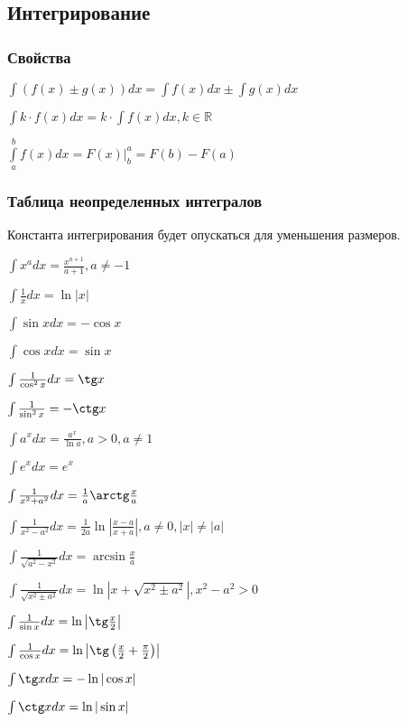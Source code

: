 \subsection{Интегрирование}

\subsubsection{Свойства}

$ \int (f(x) \pm g(x)) dx = \int f(x) dx \pm \int g(x) dx $

$ \int k\cdot f(x) dx = k\cdot \int f(x) dx, k \in \mathbb{R} $

$ \int\limits_a^b f(x) dx = \left.F(x)\right|_b^a = F(b) - F(a) $

\subsubsection{Таблица неопределенных интегралов}

Константа интегрирования будет опускаться для уменьшения размеров.

$ \int x^a dx = \frac{x^{a+1}}{a+1}, a \neq -1 $

$ \int \frac{1}{x} dx = \ln|x| $

$ \int \sin x dx = -\cos x $

$ \int \cos x dx = \sin x $

$ \int \frac{1}{\cos^2 x} dx = \tg x $

$ \int \frac{1}{\sin^2 x} = -\ctg x $

$ \int a^x dx = \frac{a^x}{\ln a}, a>0, a \neq 1 $

$ \int e^x dx = e^x $

$ \int \frac{1}{x^2 + a^2} dx = \frac{1}{a} \arctg\frac{x}{a} $

$ \int \frac{1}{x^2 - a^2} dx = \frac{1}{2a} \ln\left|\frac{x-a}{x+a}\right|, a \neq 0, |x| \neq |a| $

$ \int \frac{1}{\sqrt{a^2-x^2}} dx = \arcsin\frac{x}{a} $

$ \int \frac{1}{\sqrt{x^2\pm a^2}} dx = \ln\left|x+\sqrt{x^2\pm a^2}\right|, x^2-a^2 > 0 $

$ \int \frac{1}{\sin x} dx = \ln\left|\tg\frac{x}{2}\right| $

$ \int \frac{1}{\cos x} dx = \ln\left|\tg\left(\frac{x}{2} + \frac{\pi}{2}\right)\right| $

$ \int \tg x dx = -\ln|\cos x| $

$ \int \ctg x dx = \ln|\sin x| $

